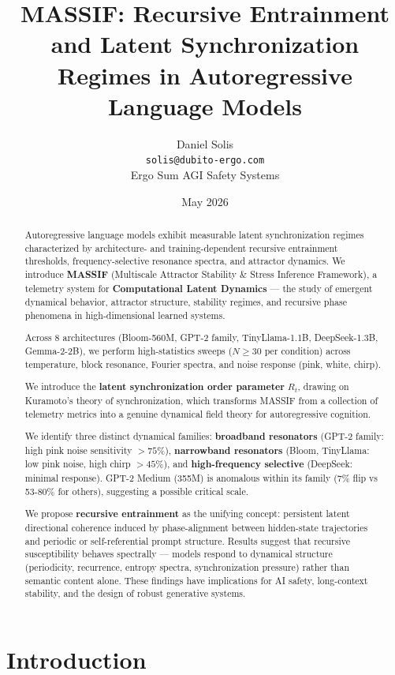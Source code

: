 \documentclass{article}
\title{MASSIF: Recursive Entrainment and Latent Synchronization Regimes in Autoregressive Language Models}
\author{Daniel Solis \\
\texttt{solis@dubito-ergo.com} \\
Ergo Sum AGI Safety Systems}
\date{May 2026}
\begin{document}
\maketitle

\begin{abstract}
Autoregressive language models exhibit measurable latent synchronization regimes characterized by architecture- and training-dependent recursive entrainment thresholds, frequency-selective resonance spectra, and attractor dynamics. We introduce \textbf{MASSIF} (Multiscale Attractor Stability \& Stress Inference Framework), a telemetry system for \textbf{Computational Latent Dynamics} — the study of emergent dynamical behavior, attractor structure, stability regimes, and recursive phase phenomena in high-dimensional learned systems.

Across 8 architectures (Bloom-560M, GPT-2 family, TinyLlama-1.1B, DeepSeek-1.3B, Gemma-2-2B), we perform high-statistics sweeps ($N \geq 30$ per condition) across temperature, block resonance, Fourier spectra, and noise response (pink, white, chirp).

We introduce the \textbf{latent synchronization order parameter} $R_t$, drawing on Kuramoto's theory of synchronization, which transforms MASSIF from a collection of telemetry metrics into a genuine dynamical field theory for autoregressive cognition.

We identify three distinct dynamical families: \textbf{broadband resonators} (GPT-2 family: high pink noise sensitivity $>75\%$), \textbf{narrowband resonators} (Bloom, TinyLlama: low pink noise, high chirp $>45\%$), and \textbf{high-frequency selective} (DeepSeek: minimal response). GPT-2 Medium (355M) is anomalous within its family (7\% flip vs 53-80\% for others), suggesting a possible critical scale.

We propose \textbf{recursive entrainment} as the unifying concept: persistent latent directional coherence induced by phase-alignment between hidden-state trajectories and periodic or self-referential prompt structure. Results suggest that recursive susceptibility behaves spectrally — models respond to dynamical structure (periodicity, recurrence, entropy spectra, synchronization pressure) rather than semantic content alone. These findings have implications for AI safety, long-context stability, and the design of robust generative systems.
\end{abstract}

\section{Introduction}
\end{document}
